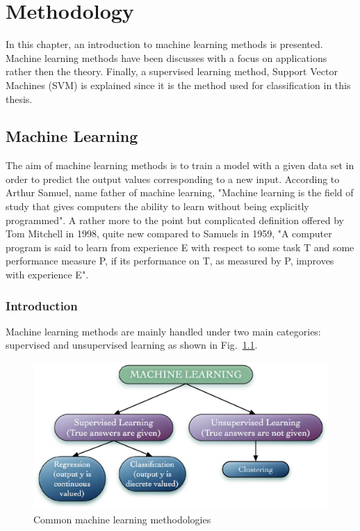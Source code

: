 \chapter{Methodology}

In this chapter, an introduction to machine learning methods is presented. 
Machine learning methods have been discusses with a focus on applications rather then the theory.
Finally, a supervised learning method, Support Vector Machines (SVM) is explained since it is the method used for classification in this thesis.

\section{Machine Learning}

The aim of machine learning methods is to train a model with a given data set in order to predict the output values corresponding to a new input. 
According to Arthur Samuel, name father of machine learning, "Machine learning is the field of study that gives computers the ability to learn without being explicitly programmed". 
A rather more to the point but complicated definition offered by Tom Mitchell in 1998, quite new compared to Samuel\textquotesingle s in 1959, "A computer program is said to learn from experience E with respect to some task T and some performance measure P, if its performance on T, as measured by P, improves with experience E".

\subsection{Introduction}
Machine learning methods are mainly handled under two main categories: supervised and unsupervised learning as shown in Fig.~\ref{fig:machineLearningMethodsSerious}. 

\begin{figure}
\begin{center}
\includegraphics[width=14cm]{figures/machineLearningMethodsSerious}    %
\caption{Common machine learning methodologies} 
\label{fig:machineLearningMethodsSerious}
\end{center}
\end{figure}

